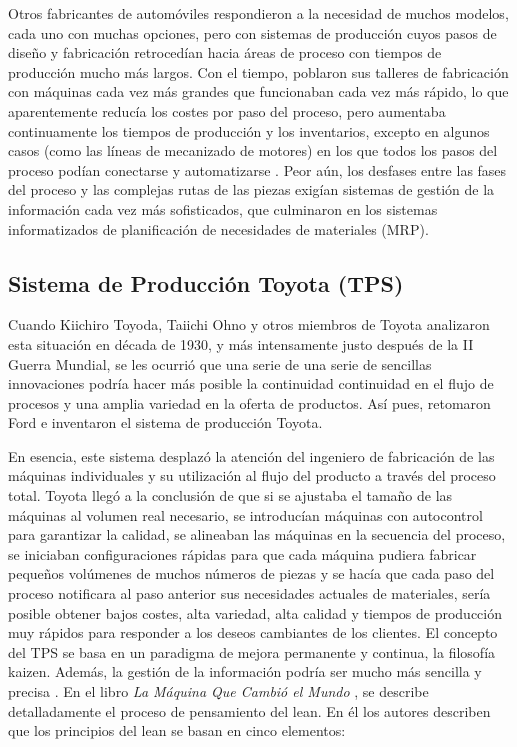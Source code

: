 Otros fabricantes de automóviles respondieron a la necesidad de muchos modelos, cada uno con muchas opciones, pero con sistemas de producción cuyos pasos de diseño y fabricación retrocedían hacia áreas de proceso con tiempos de producción mucho más largos.
Con el tiempo, poblaron sus talleres de fabricación con máquinas cada vez más grandes que funcionaban cada vez más rápido, lo que aparentemente reducía los costes por paso del proceso, pero aumentaba continuamente los tiempos de producción y los inventarios, excepto en algunos casos (como las líneas de mecanizado de motores) en los que todos los pasos del proceso podían conectarse y automatizarse \cite{hounshell_same_1988}.
Peor aún, los desfases entre las fases del proceso y las complejas rutas de las piezas exigían sistemas de gestión de la información cada vez más sofisticados, que culminaron en los sistemas informatizados de planificación de necesidades de materiales (MRP).

\subsection{Sistema de Producción Toyota (TPS)}

Cuando Kiichiro Toyoda, Taiichi Ohno y otros miembros de Toyota analizaron esta situación en década de 1930, y más intensamente justo después de la II Guerra Mundial, se les ocurrió que una serie de una serie de sencillas innovaciones podría hacer más posible la continuidad continuidad en el flujo de procesos y una amplia variedad en la oferta de productos.
Así pues, retomaron Ford e inventaron el sistema de producción Toyota.

En esencia, este sistema desplazó la atención del ingeniero de fabricación de las máquinas individuales y su utilización al flujo del producto a través del proceso total.
Toyota llegó a la conclusión de que si se ajustaba el tamaño de las máquinas al volumen real necesario, se introducían máquinas con autocontrol para garantizar la calidad, se alineaban las máquinas en la secuencia del proceso, se iniciaban configuraciones rápidas para que cada máquina pudiera fabricar pequeños volúmenes de muchos números de piezas y se hacía que cada paso del proceso notificara al paso anterior sus necesidades actuales de materiales, sería posible obtener bajos costes, alta variedad, alta calidad y tiempos de producción muy rápidos para responder a los deseos cambiantes de los clientes.
El concepto del TPS se basa en un paradigma de mejora permanente y continua, la filosofía kaizen.
Además, la gestión de la información podría ser mucho más sencilla y precisa \cite{liker_toyota_2006}.
En el libro \textit{La Máquina Que Cambió el Mundo} \cite{womack_machine_2007}, se describe detalladamente el proceso de pensamiento del lean.
En él los autores describen que los principios del lean se basan en cinco elementos:

